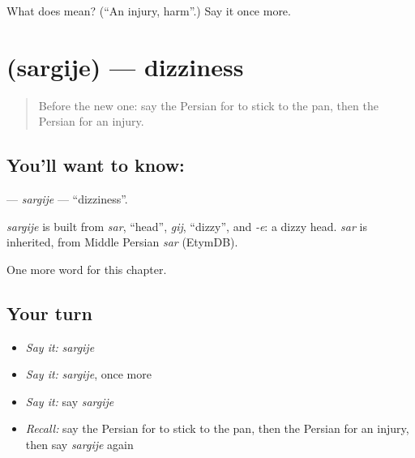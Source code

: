 \begin{tcolorbox}[breakable,colback=teal!4,colframe=teal!35!black,title={Before you move on}]
What does  mean? (\textquotedblleft{}An injury, harm\textquotedblright{}.) Say it once more.
\end{tcolorbox}
\section[\texorpdfstring{\fa{سرگیجه} (sargije)}{سرگیجه (sargije)}]{ (sargije) — dizziness}

\label{lesson:FA-C263-sargije}



\begin{quote}
Before the new one: say the Persian for to stick to the pan, then the Persian for an injury.
\end{quote}

\subsection*{You'll want to know: }
\textbf{} — \emph{sargije} — \textquotedblleft{}dizziness\textquotedblright{}.

\begin{cousinweb}
\emph{sargije} is built from \emph{sar}, \textquotedblleft{}head\textquotedblright{}, \emph{gij}, \textquotedblleft{}dizzy\textquotedblright{}, and \emph{-e}: a dizzy head. \emph{sar} is inherited, from Middle Persian \emph{sar} (EtymDB).
\end{cousinweb}

\begin{grammarlens}[title={What you've built}]
One more word for this chapter.
\end{grammarlens}

\subsection*{Your turn}
\begin{itemize}
\raggedright
  \item \emph{Say it:} \emph{sargije}
  \item \emph{Say it:} \emph{sargije}, once more
  \item \emph{Say it:} say \emph{sargije}
  \item \emph{Recall:} say the Persian for to stick to the pan, then the Persian for an injury, then say \emph{sargije} again
\end{itemize}

